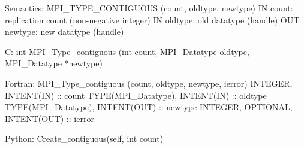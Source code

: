 Semantics:
MPI_TYPE_CONTIGUOUS
   (count, oldtype, newtype)
IN count: replication count (non-negative integer)
IN oldtype: old datatype (handle)
OUT newtype: new datatype (handle)

C:
int MPI_Type_contiguous
   (int count, MPI_Datatype oldtype, MPI_Datatype *newtype)

Fortran:
MPI_Type_contiguous
   (count, oldtype, newtype, ierror)
INTEGER, INTENT(IN) :: count
TYPE(MPI_Datatype), INTENT(IN) :: oldtype
TYPE(MPI_Datatype), INTENT(OUT) :: newtype
INTEGER, OPTIONAL, INTENT(OUT) :: ierror

Python:
Create_contiguous(self, int count)
